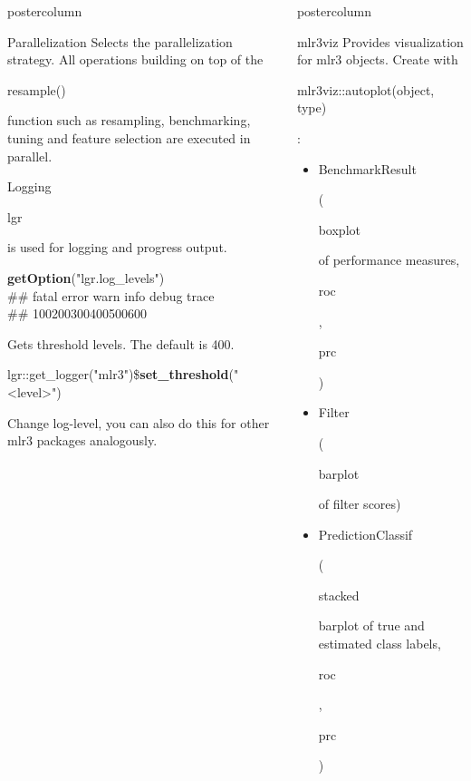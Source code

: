 \documentclass{beamer}
\newlength{\columnheight} %
\newcommand{\codeinline}[1]{\begin{codeboxinline}#1\end{codeboxinline}}
\newcommand{\monospace}[1]{\multido{}{#1}{\space}}
\begin{document}
\begin{withoutheader}
\begin{frame}[fragile]{}
\begin{columns}
\begin{column}{.245\textwidth}
\begin{beamercolorbox}[center]{postercolumn}
\begin{minipage}{.98\textwidth}
{\begin{myblock}{Parallelization}
							Selects the parallelization strategy. 
							All operations building on top of the \codeinline{resample()} function 
							such as resampling, benchmarking, tuning and feature selection are executed in parallel.
						\end{myblock}
						\begin{myblock}{Logging}
							\codeinline{lgr} is used for logging and progress output.
							\\
							\begin{codeboxmultiline}[width=23.1cm]
								\textbf{getOption}("lgr.log\_levels")\\
								\#\# fatal error  warn  info debug trace\\ 
								\#\# 100\monospace{3}200\monospace{3}300\monospace{2}400\monospace{2}500\monospace{3}600
							\end{codeboxmultiline}
							Gets threshold levels. The default is 400. 
							\\
							\begin{codeboxmultiline}[width=25cm]
								\footnotesize{
									lgr::get\_logger("mlr3")\$\textbf{set\_threshold}("<level>")}
							\end{codeboxmultiline}
							Change log-level, you can also do this for other mlr3 packages analogously.
						\end{myblock}
					\vfill}
				\end{minipage}
			\end{beamercolorbox}
		\end{column}
		\begin{column}{.245\textwidth}
			\begin{beamercolorbox}[center]{postercolumn}
				\begin{minipage}{.98\textwidth}
					\parbox[t][\columnheight]{\textwidth}{
						\begin{myblock}{mlr3viz}
							Provides visualization for mlr3 objects.
							Create with \codeinline{mlr3viz::autoplot(object, type)}:
							\begin{itemize}
								\item \codeinline{BenchmarkResult} (\codeinline{boxplot} of performance measures, \codeinline{roc}, \codeinline{prc})\\
								\item \codeinline{Filter} (\codeinline{barplot} of filter scores)\\
								\item \codeinline{PredictionClassif} (\codeinline{stacked} barplot of true and estimated class labels, \codeinline{roc}, \codeinline{prc})

\end{itemize}
\end{myblock}}
\end{minipage}
\end{beamercolorbox}
\end{column}
\end{columns}
\end{frame}
\end{withoutheader}
\end{document}
